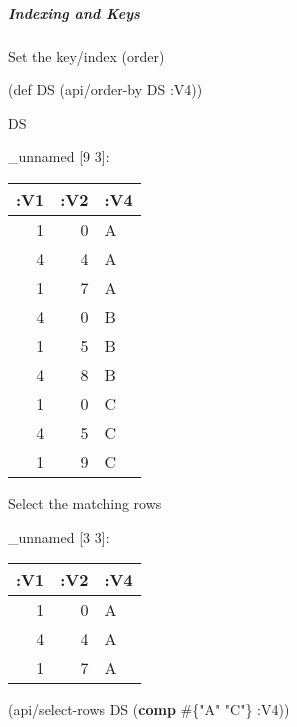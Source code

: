 \documentclass[]{article}
\newenvironment{Shaded}{\begin{snugshade}}{\end{snugshade}}
\newcommand{\KeywordTok}[1]{\textcolor[rgb]{0.13,0.29,0.53}{\textbf{#1}}}
\newcommand{\StringTok}[1]{\textcolor[rgb]{0.31,0.60,0.02}{#1}}
\newcommand{\FunctionTok}[1]{\textcolor[rgb]{0.00,0.00,0.00}{#1}}
\newcommand{\VariableTok}[1]{\textcolor[rgb]{0.00,0.00,0.00}{#1}}
\newcommand{\BuiltInTok}[1]{#1}
\newcommand{\AttributeTok}[1]{\textcolor[rgb]{0.77,0.63,0.00}{#1}}
\newcommand{\NormalTok}[1]{#1}
\let\oldsubparagraph\subparagraph
\renewcommand{\subparagraph}[1]{\oldsubparagraph{#1}\mbox{}}
\begin{document}
\subparagraph{Indexing and Keys}\label{indexing-and-keys}

Set the key/index (order)

\begin{Shaded}
\begin{Highlighting}[]
\NormalTok{(}\BuiltInTok{def}\FunctionTok{ DS }\NormalTok{(api/order-by DS }\AttributeTok{:V4}\NormalTok{))}
\end{Highlighting}
\end{Shaded}

\begin{Shaded}
\begin{Highlighting}[]
\NormalTok{DS}
\end{Highlighting}
\end{Shaded}

\_unnamed {[}9 3{]}:

\begin{longtable}[]{@{}rrl@{}}
\toprule
:V1 & :V2 & :V4\tabularnewline
\midrule
\endhead
1 & 0 & A\tabularnewline
4 & 4 & A\tabularnewline
1 & 7 & A\tabularnewline
4 & 0 & B\tabularnewline
1 & 5 & B\tabularnewline
4 & 8 & B\tabularnewline
1 & 0 & C\tabularnewline
4 & 5 & C\tabularnewline
1 & 9 & C\tabularnewline
\bottomrule
\end{longtable}

Select the matching rows

\begin{Shaded}
\end{Shaded}

\_unnamed {[}3 3{]}:

\begin{longtable}[]{@{}rrl@{}}
\toprule
:V1 & :V2 & :V4\tabularnewline
\midrule
\endhead
1 & 0 & A\tabularnewline
4 & 4 & A\tabularnewline
1 & 7 & A\tabularnewline
\bottomrule
\end{longtable}

\begin{Shaded}
\begin{Highlighting}[]
\NormalTok{(api/select-rows DS (}\KeywordTok{comp}\NormalTok{ #\{}\StringTok{"A"} \StringTok{"C"}\NormalTok{\} }\AttributeTok{:V4}\NormalTok{))}
\end{Highlighting}
\end{Shaded}
\end{document}
